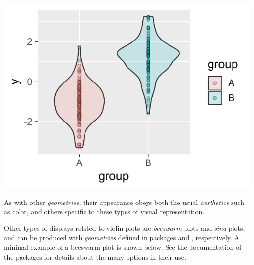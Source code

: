 \documentclass[krantz2]{krantz}\usepackage{knitr}
\begin{document}
\begin{knitrout}\footnotesize
{}\color{fgcolor}\begin{kframe}
\begin{alltt}
    \hlopt{+}
  \hlstd{(} \hlstd{=} \hlstd{)} \hlopt{+}
  \hlstd{(} \hlstd{=} \hlstd{,}  \hlstd{=} \hlstd{,}
              \hlstd{=} \hlstd{,}  \hlstd{=} \hlstd{)}
\end{alltt}
\end{kframe}

{\centering \includegraphics[width=.54\textwidth]{figure/pos-violin-plot-02-1}

}



\end{knitrout}

As with other \emph{geometries}, their appearance obeys both the usual \emph{aesthetics} such as color, and others specific to these types of visual representation.

Other types of displays related to violin plots are \emph{beeswarm} plots and \emph{sina} plots, and can be produced with \emph{geometries} defined in packages  and , respectively. A minimal example of a beeswarm plot is shown below. See the documentation of the packages for details about the many options in their use.
\end{document}

